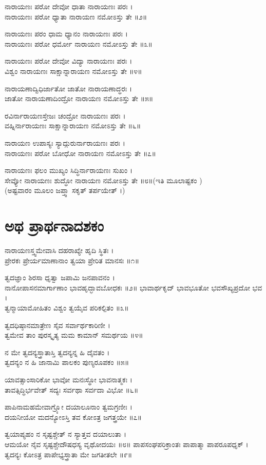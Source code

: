 ನಾರಾಯಣಃ ಪರೋ ದೇವೋ ಧಾತಾ ನಾರಾಯಣಃ ಪರಃ ।\\
ನಾರಾಯಣಃ ಪರೋ ಧ್ಯಾತಾ ನಾರಾಯಣ ನಮೋಽಸ್ತು ತೇ ॥೨॥

	ನಾರಾಯಣಃ ಪರಂ ಧಾಮ ಧ್ಯಾನಂ ನಾರಾಯಣಃ ಪರಃ ।\\
	ನಾರಾಯಣಃ ಪರೋ ಧರ್ಮೋ ನಾರಾಯಣ ನಮೋಽಸ್ತು ತೇ ॥೩॥

ನಾರಾಯಣಃ ಪರೋ ದೇವೋ ವಿದ್ಯಾ ನಾರಾಯಣಃ ಪರಃ ।\\
ವಿಶ್ವಂ ನಾರಾಯಣಃ ಸಾಕ್ಷಾನ್ನಾರಾಯಣ ನಮೋಽಸ್ತು ತೇ ॥೪॥

	ನಾರಾಯಣಾದ್ವಿಧಿರ್ಜಾತೋ ಜಾತೋ ನಾರಾಯಣಾದ್ಧರಃ ।\\
	ಜಾತೋ ನಾರಾಯಣಾದಿಂದ್ರೋ ನಾರಾಯಣ ನಮೋಽಸ್ತು ತೇ ॥೫॥

ರವಿರ್ನಾರಾಯಣಸ್ತೇಜಃ ಚಂದ್ರೋ ನಾರಾಯಣಃ ಪರಃ ।\\
ವಹ್ನಿರ್ನಾರಾಯಣಃ ಸಾಕ್ಷಾನ್ನಾರಾಯಣ ನಮೋಽಸ್ತು ತೇ ॥೬॥

	ನಾರಾಯಣ ಉಪಾಸ್ಯಃ ಸ್ಯಾದ್ಗುರುರ್ನಾರಾಯಣಃ ಪರಃ ।\\
	ನಾರಾಯಣಃ ಪರೋ ಬೋಧೋ ನಾರಾಯಣ ನಮೋಽಸ್ತು ತೇ ॥೭॥

ನಾರಾಯಣಃ ಫಲಂ ಮುಖ್ಯಂ ಸಿದ್ಧಿರ್ನಾರಾಯಣಃ ಸುಖಂ ।\\
ಸೇವ್ಯೋ ನಾರಾಯಣಃ ಶುದ್ಧೋ ನಾರಾಯಣ ನಮೋಽಸ್ತು ತೇ ॥೮॥(ಇತಿ ಮೂಲಾಷ್ಟಕಂ )\\
(ಅಷ್ಟವಾರಂ ಮೂಲಂ ಜಪ್ತ್ವಾ ಸಕೃತ್ ತರ್ಪಯೇತ್ ।)
\section{ಅಥ ಪ್ರಾರ್ಥನಾದಶಕಂ}
	ನಾರಾಯಣಸ್ತ್ವಮೇವಾಸಿ ದಹರಾಖ್ಯೇ ಹೃದಿ ಸ್ಥಿತಃ ।\\
	ಪ್ರೇರಕಃ ಪ್ರೇರ್ಯಮಾಣಾನಾಂ ತ್ವಯಾ ಪ್ರೇರಿತ ಮಾನಸಃ ॥೧॥

ತ್ವದಜ್ಞಾಂ ಶಿರಸಾ ಧೃತ್ವಾ ಜಪಾಮಿ ಜನಪಾವನಂ ।\\
ನಾನೋಪಾಸನಮಾರ್ಗಾಣಾಂ ಭಾವಹೃದ್ಭಾವಬೋಧಕಃ ॥೨॥
\newpage
	ಭಾವಾರ್ಥಕೃದ್ ಭಾವಭೂತೋ ಭವಸೌಖ್ಯಪ್ರದೋ ಭವ ।\\
	ತ್ವನ್ಮಾಯಾಮೋಹಿತಂ ವಿಶ್ವಂ ತ್ವಯೈವ ಪರಿಕಲ್ಪಿತಂ ॥೩॥

ತ್ವದಧಿಷ್ಠಾನಮಾತ್ರೇಣ ಸೈವ ಸರ್ವಾರ್ಥಕಾರಿಣೀ ।\\
ತ್ವಮೇವ ತಾಂ ಪುರಸ್ಕೃತ್ಯ ಮಮ ಕಾಮಾನ್ ಸಮರ್ಥಯ ॥೪॥

	ನ ಮೇ ತ್ವದನ್ಯಸ್ತ್ರಾತಾಸ್ತಿ ತ್ವದನ್ಯನ್ನ ಹಿ ದೈವತಂ ।\\
	ತ್ವದನ್ಯಂ ನ ಹಿ ಜಾನಾಮಿ ಪಾಲಕಂ ಪುಣ್ಯರೂಪಕಂ ॥೫॥

ಯಾವತ್ಸಾಂಸಾರಿಕೋ ಭಾವೋ ಮನಃಸ್ಥೋ ಭಾವನಾತ್ಮಕಃ ।\\
ತಾವತ್ಸಿದ್ಧಿರ್ಭವೇತ್ ಸದ್ಯಃ ಸರ್ವಥಾ ಸರ್ವದಾ ವಿಭೋ ॥೬॥

	ಪಾಪಿನಾಮಹಮೇವಾಗ್ರ್ಯೋ ದಯಾಲೂನಾಂ ತ್ವಮಗ್ರಣೀಃ ।\\
	ದಯನೀಯೋ ಮದನ್ಯೋಽಸ್ತಿ ತವ ಕೋಽತ್ರ ಜಗತ್ತ್ರಯೇ ॥೭॥

ತ್ವಯಾಪ್ಯಹಂ ನ ಸೃಷ್ಟಶ್ಚೇತ್ ನ ಸ್ಯಾತ್ತವ ದಯಾಲುತಾ ।\\
ಆಮಯೋ ನೈವ ಸೃಷ್ಟಶ್ಚೇದೌಷಧಸ್ಯ ವೃಥೋದಯಃ ॥೮॥
\newpage
	ಪಾಪಸಂಘಪರಿಕ್ರಾಂತಃ ಪಾಪಾತ್ಮಾ ಪಾಪರೂಪಧೃಕ್ ।\\
	ತ್ವದನ್ಯಃ ಕೋಽತ್ರ ಪಾಪೇಭ್ಯಸ್ತ್ರಾತಾ ಮೇ ಜಗತೀತಲೇ ॥೯॥

